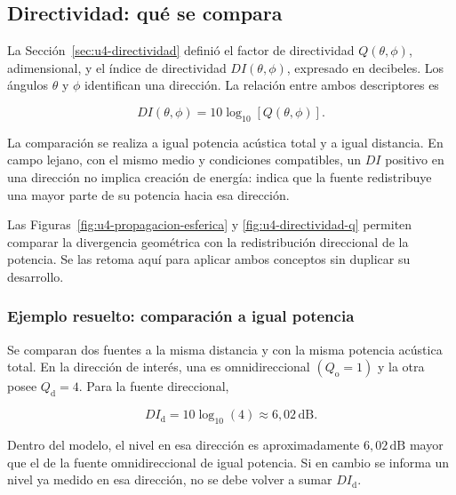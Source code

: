 \subsection{Directividad: qué se compara}
\label{sec:u9-directividad}

La Sección~\ref{sec:u4-directividad} definió el factor de directividad
\(Q(\theta,\phi)\), adimensional, y el índice de directividad
\(DI(\theta,\phi)\), expresado en decibeles. Los ángulos \(\theta\) y \(\phi\)
identifican una dirección. La relación entre ambos descriptores es

\begin{equation}
    DI(\theta,\phi)
      =10\log_{10}\!\left[Q(\theta,\phi)\right].
    \label{eq:u9-indice-directividad}
\end{equation}

La comparación se realiza a igual potencia acústica total y a igual distancia.
En campo lejano, con el mismo medio y condiciones compatibles, un \(DI\)
positivo en una dirección no implica creación de energía: indica que la fuente
redistribuye una mayor parte de su potencia hacia esa dirección.


Las Figuras~\ref{fig:u4-propagacion-esferica} y
\ref{fig:u4-directividad-q} permiten comparar la divergencia geométrica con
la redistribución direccional de la potencia. Se las retoma aquí para aplicar
ambos conceptos sin duplicar su desarrollo.

\subsubsection*{Ejemplo resuelto: comparación a igual potencia}

Se comparan dos fuentes a la misma distancia y con la misma potencia acústica
total. En la dirección de interés, una es omnidireccional
\((Q_\mathrm{o}=1)\) y la otra posee \(Q_\mathrm{d}=4\). Para la fuente
direccional,

\[
    DI_\mathrm{d}
      =10\log_{10}(4)
      \approx6{,}02\,\text{dB}.
\]

Dentro del modelo, el nivel en esa dirección es aproximadamente
\(6{,}02\,\text{dB}\) mayor que el de la fuente omnidireccional de igual
potencia. Si en cambio se informa un nivel ya medido en esa dirección, no se
debe volver a sumar \(DI_\mathrm{d}\).

